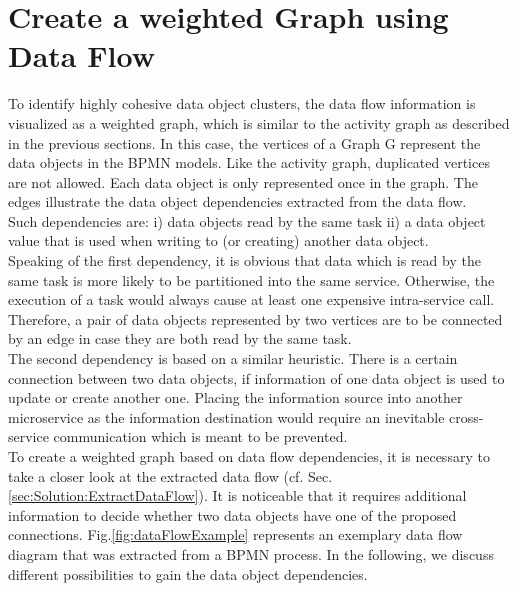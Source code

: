 \section{Create a weighted Graph using Data Flow}
\label{sec:Solution:CreateGraphData}
To identify highly cohesive data object clusters, the data flow information is visualized as a weighted graph, which is similar to the activity graph as described in the previous sections. In this case, the vertices of a Graph G represent the data objects in the BPMN models. Like the activity graph, duplicated vertices are not allowed. Each data object is only represented once in the graph. The edges illustrate the data object dependencies extracted from the data flow. \\
Such dependencies are: i) data objects read by the same task ii) a data object value that is used when writing to (or creating) another data object. \\
Speaking of the first dependency, it is obvious that data which is read by the same task is more likely to be partitioned into the same service. Otherwise, the execution of a task would always cause at least one expensive intra-service call.
Therefore, a pair of data objects represented by two vertices are to be connected by an edge in case they are both read by the same task.\\
The second dependency is based on a similar heuristic. There is a certain connection between two data objects, if information of one data object is used to update or create another one. Placing the information source into another microservice as the information destination would require an inevitable cross-service communication which is meant to be prevented. \\
To create a weighted graph based on data flow dependencies, it is necessary to take a closer look at the extracted data flow (cf. Sec.\ref{sec:Solution:ExtractDataFlow}). It is noticeable that it requires additional information to decide whether two data objects have one of the proposed connections. Fig.\ref{fig:dataFlowExample} represents an exemplary data flow diagram that was extracted from a BPMN process. In the following, we discuss different possibilities to gain the data object dependencies.


